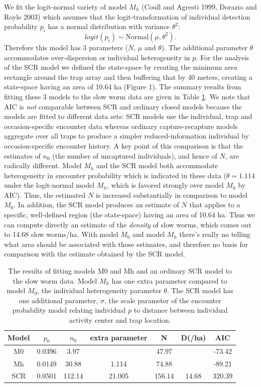 \documentclass{book}
\begin{document}
We fit the logit-normal variety of model $M_h$ (Coull and Agresti
1999, Dorazio and Royle 2003) which assumes that the
logit-transformation of individual detection probability $p_i$ has a
normal distribution with variance $\theta^2$:
\[
 logit(p_i) \sim \mbox{Normal}(\mu, \theta^2).
\]
Therefore this model has 3 parameters ($N$, $\mu$ and $\theta$).  The
additional parameter $\theta$ accommodates over-dispersion or
individual heterogeneity in $p$.
For the analysis of the SCR model we defined
 the state-space by creating the minimum area rectangle around the trap array
and then buffering that by 40 meters, creating a state-space having an
area of 10.64 ha (Figure 1).
The summary results from fitting these 3 models to the slow worm data
are given in Table \ref{tab.results}. We note that
AIC is {\it not} comparable between SCR and ordinary closed models because the
models are fitted to different data sets:
SCR models use the individual, trap and occasion-specific
encounter data whereas ordinary capture-recapture models aggregate
over all traps to produce a simpler reduced-information individual by
occasion-specific encounter history.  A key point of this comparison
is that the estimates of $n_0$ (the number of uncaptured individuals),
and hence of $N$, are radically different. Model $M_h$ and the SCR
model both accommodate heterogeneity in encounter probability which is
indicated in these data ($\theta = 1.114$ under the logit-normal model
$M_h$, which is favored strongly over model $M_0$ by AIC). Thus, the estimated $N$ is increased substantially in
comparison to model $M_0$. In addition, the SCR model produces an
estimate of $N$ that applies to a specific, well-defined region (the
state-space) having an area of 10.64 ha. Thus we can compute directly
an estimate of the {\it density} of slow worms, which comes out to
14.68 slow worms/ha.  With model $M_0$ and model $M_h$ there's really
no telling what area should be associated with those estimates, and
therefore no basis for comparison with the estimate obtained by the
SCR model.


\begin{table}[ht]
\centering
\caption{The results of fitting models M0 and Mh and an ordinary SCR
  model to the slow worm data. Model $M_h$ has one extra parameter
  compared to model $M_0$, the individual heterogeneity parameter
  $\theta$. The SCR model has one additional parameter, $\sigma$, the
  scale parameter of the encounter probability model relating
  individual $p$ to distance between individual activity center and
  trap location. }
\begin{tabular}{ccccccc}
Model & $p_0$ &  $n_0$   & extra parameter & N      & D(/ha)  & AIC     \\ \hline
M0    &  0.0396  & 3.97  &                & 47.97 &         & -73.42  \\
Mh    &  0.0149  & 30.88 & 1.114        & 74.88 &         & -89.21  \\
SCR   &  0.0501  & 112.14& 21.005        & 156.14 & 14.68   & 320.39  \\
\end{tabular}
\label{tab.results}
\end{table}
\end{document}
